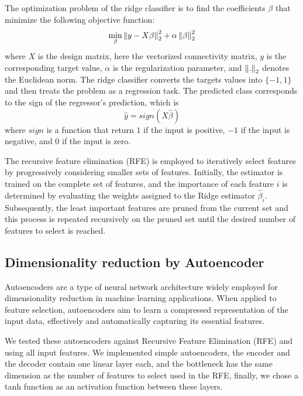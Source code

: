The optimization problem of the ridge classifier is to find the coefficients $\beta$ that minimize the following objective function:
$$
\min_{\beta} \left\lVert y - X\beta\right\rVert_2^2 + \alpha \left\lVert\beta\right\rVert_2^2
$$
where $X$ is the design matrix, here the vectorized connectivity matrix, $y$ is the corresponding target value, $\alpha$ is the regularization parameter, and $\left\lVert.\right\rVert_2$ denotes the Euclidean norm. The ridge classifier converts the targets values into $\{-1, 1\}$ and then treats the problem as a regression task. The predicted class corresponds to the sign of the regressor's prediction, which is
$$
\hat{y} = sign(X\hat{\beta})
$$
where $sign$ is a function that return $1$ if the input is positive, $-1$ if the input is negative, and $0$ if the input is zero.

The recursive feature elimination (RFE) is employed to iteratively select features by progressively considering smaller sets of features. Initially, the estimator is trained on the complete set of features, and the importance of each feature $i$ is determined by evaluating the weights assigned to the Ridge estimator $\hat{\beta}_i$. Subsequently, the least important features are pruned from the current set and this process is repeated recursively on the pruned set until the desired number of features to select is reached.

\subsection{Dimensionality reduction by Autoencoder}

\quad Autoencoders are a type of neural network architecture widely employed for dimensionality reduction in machine learning applications. When applied to feature selection, autoencoders aim to learn a compressed representation of the input data, effectively and automatically capturing its essential features.

We tested these autoencoders against Recursive Feature Elimination (RFE) and using all input features. We implemented simple autoencoders, the encoder and the decoder contain one linear layer each, and the bottleneck has the same dimension as the number of features to select used in the RFE, finally, we chose a tanh function as an activation function between these layers.

